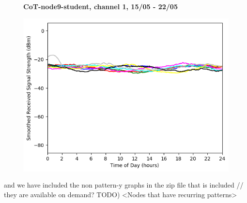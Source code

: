 \documentclass[a4paper, 11pt]{article}
\begin{document}
\begin{figure}[h!]
    \centering
    \textbf{CoT-node9-student, channel 1, 15/05 - 22/05}\par\medskip
	\includegraphics[scale=0.5]{images/2_4_GHz/cot-node9-student_2017-05-22_chan1_image.png}
\end{figure}
and we have included the non pattern-y graphs in the zip file that is included // they are available on demand? TODO) 
<Nodes that have recurring patterns>
\end{document}
